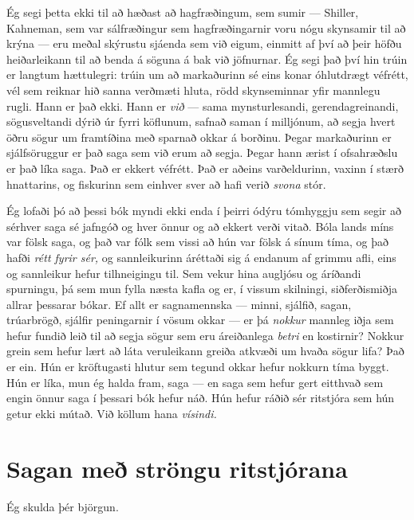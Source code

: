 Ég segi þetta ekki til að hæðast að hagfræðingum, sem sumir — Shiller, Kahneman, sem var sálfræðingur sem hagfræðingarnir voru nógu skynsamir til að krýna — eru meðal skýrustu sjáenda sem við eigum, einmitt af því að þeir höfðu heiðarleikann til að benda á söguna á bak við jöfnurnar. Ég segi það því hin trúin er langtum hættulegri: trúin um að markaðurinn sé eins konar óhlutdrægt véfrétt, vél sem reiknar hið sanna verðmæti hluta, rödd skynseminnar yfir mannlegu rugli. Hann er það ekki. Hann er \emph{við} — sama mynsturlesandi, gerendagreinandi, sögusveltandi dýrið úr fyrri köflunum, safnað saman í milljónum, að segja hvert öðru sögur um framtíðina með sparnað okkar á borðinu. Þegar markaðurinn er sjálfsöruggur er það saga sem við erum að segja. Þegar hann ærist í ofsahræðslu er það líka saga. Það er ekkert véfrétt. Það er aðeins varðeldurinn, vaxinn í stærð hnattarins, og fiskurinn sem einhver sver að hafi verið \emph{svona} stór.

Ég lofaði þó að þessi bók myndi ekki enda í þeirri ódýru tómhyggju sem segir að sérhver saga sé jafngóð og hver önnur og að ekkert verði vitað. Bóla lands míns var fölsk saga, og það var fólk sem vissi að hún var fölsk á sínum tíma, og það hafði \emph{rétt fyrir sér,} og sannleikurinn áréttaði sig á endanum af grimmu afli, eins og sannleikur hefur tilhneigingu til. Sem vekur hina augljósu og áríðandi spurningu, þá sem mun fylla næsta kafla og er, í vissum skilningi, siðferðismiðja allrar þessarar bókar. Ef allt er sagnamennska — minni, sjálfið, sagan, trúarbrögð, sjálfir peningarnir í vösum okkar — er þá \emph{nokkur} mannleg iðja sem hefur fundið leið til að segja sögur sem eru áreiðanlega \emph{betri} en kostirnir? Nokkur grein sem hefur lært að láta veruleikann greiða atkvæði um hvaða sögur lifa? Það er ein. Hún er kröftugasti hlutur sem tegund okkar hefur nokkurn tíma byggt. Hún er líka, mun ég halda fram, saga — en saga sem hefur gert eitthvað sem engin önnur saga í þessari bók hefur náð. Hún hefur ráðið sér ritstjóra sem hún getur ekki mútað. Við köllum hana \emph{vísindi.}

\chapter{Sagan með ströngu ritstjórana}

Ég skulda þér björgun.

